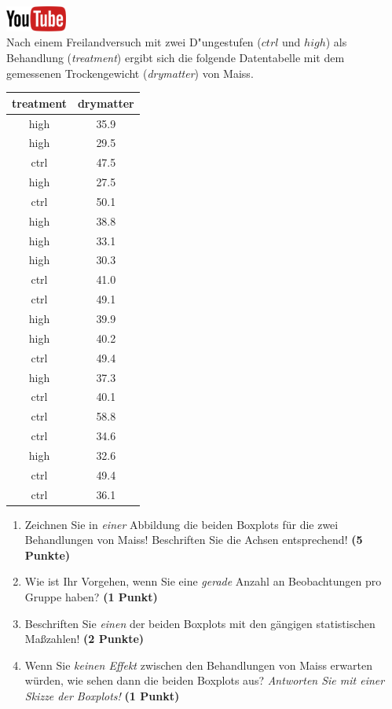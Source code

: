 \documentclass[a4paper, 9pt]{scrartcl}\usepackage[]{graphicx}\usepackage[]{xcolor}
\begin{document}
\hfill\href{https://youtu.be/0xc0jIPeiyw}{\includegraphics[width =
  2cm]{img/youtube}}\\[1Ex]



Nach einem Freilandversuch mit zwei D{"u}ngestufen ($ctrl$ und $high$) als Behandlung
(\textit{treatment}) ergibt sich die folgende Datentabelle mit dem
gemessenen Trockengewicht (\textit{drymatter}) von Maiss.

\begin{table}[!h]
\centering
\begin{tabular}{cc}
\toprule
treatment & drymatter\\
\midrule
high & 35.9\\
high & 29.5\\
ctrl & 47.5\\
high & 27.5\\
ctrl & 50.1\\
\addlinespace
high & 38.8\\
high & 33.1\\
high & 30.3\\
ctrl & 41.0\\
ctrl & 49.1\\
\addlinespace
high & 39.9\\
high & 40.2\\
ctrl & 49.4\\
high & 37.3\\
ctrl & 40.1\\
\addlinespace
ctrl & 58.8\\
ctrl & 34.6\\
high & 32.6\\
ctrl & 49.4\\
ctrl & 36.1\\
\bottomrule
\end{tabular}
\end{table}



\begin{enumerate}
\item Zeichnen Sie in \textit{einer} Abbildung die beiden Boxplots f{\"u}r die
  zwei Behandlungen von Maiss! Beschriften Sie die Achsen entsprechend!
  \textbf{(5 Punkte)} 
\item Wie ist Ihr Vorgehen, wenn Sie eine \textit{gerade} Anzahl an
  Beobachtungen pro Gruppe haben? \textbf{(1 Punkt)}
\item Beschriften Sie \textit{einen} der beiden Boxplots mit den g{\"a}ngigen
  statistischen Ma{\ss}zahlen! \textbf{(2 Punkte)}
\item Wenn Sie \textit{keinen Effekt} zwischen den Behandlungen von
  Maiss erwarten w{\"u}rden, wie sehen dann die beiden Boxplots aus?
  \textit{Antworten Sie mit einer Skizze der Boxplots!}
  \textbf{(1 Punkt)}
\end{enumerate} 
\clearpage
\end{document}
